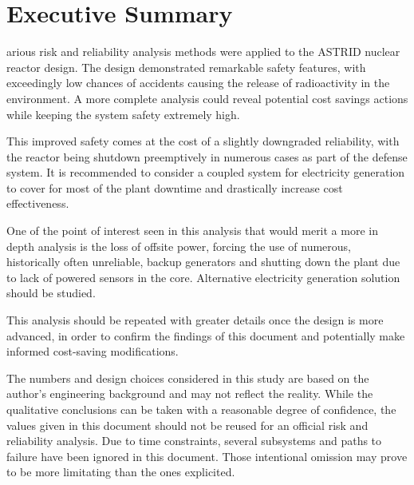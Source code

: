 %
%
%

\chapter*{Executive Summary}
\begin{SingleSpace}
arious risk and reliability analysis methods were applied to the ASTRID nuclear reactor design. The design demonstrated remarkable safety features, with exceedingly low chances of accidents causing the release of radioactivity in the environment. A more complete analysis could reveal potential cost savings actions while keeping the system safety extremely high.

This improved safety comes at the cost of a slightly downgraded reliability, with the reactor being shutdown preemptively in numerous cases as part of the defense system. It is recommended to consider a coupled system for electricity generation to cover for most of the plant downtime and drastically increase cost effectiveness.

One of the point of interest seen in this analysis that would merit a more in depth analysis is the loss of offsite power, forcing the use of numerous, historically often unreliable, backup generators and shutting down the plant due to lack of powered sensors in the core. Alternative electricity generation solution should be studied.

This analysis should be repeated with greater details once the design is more advanced, in order to confirm the findings of this document and potentially make informed cost-saving modifications.

The numbers and design choices considered in this study are based on the author's engineering background and may not reflect the reality. While the qualitative conclusions can be taken with a reasonable degree of confidence, the values given in this document should not be reused for an official risk and reliability analysis. Due to time constraints, several subsystems and paths to failure have been ignored in this document. Those intentional omission may prove to be more limitating than the ones explicited.
\end{SingleSpace}
\clearpage

